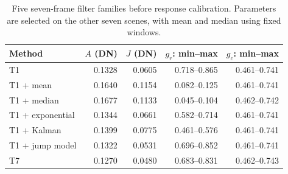 \begin{table}[!t]
\centering
\caption{Five seven-frame filter families before response calibration. Parameters are selected on the other seven scenes, with mean and median using fixed windows.}\label{tab:filters_raw}
\footnotesize
\begin{tabular}{lrrrr}
\toprule
Method & $A$ (DN) & $J$ (DN) & $g_r$: min--max & $g_c$: min--max \\
\midrule
T1 & 0.1328 & 0.0605 & 0.718--0.865 & 0.461--0.741 \\
T1 + mean & 0.1640 & 0.1154 & 0.082--0.125 & 0.461--0.741 \\
T1 + median & 0.1677 & 0.1133 & 0.045--0.104 & 0.462--0.742 \\
T1 + exponential & 0.1344 & 0.0661 & 0.582--0.714 & 0.461--0.741 \\
T1 + Kalman & 0.1399 & 0.0775 & 0.461--0.576 & 0.461--0.741 \\
T1 + jump model & 0.1322 & 0.0531 & 0.696--0.852 & 0.461--0.741 \\
T7 & 0.1270 & 0.0480 & 0.683--0.831 & 0.462--0.743 \\
\bottomrule
\end{tabular}
\end{table}
